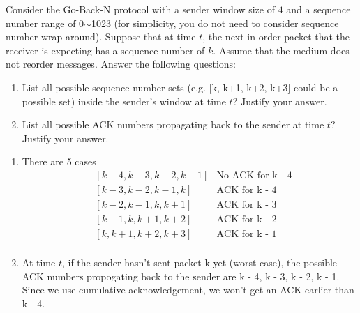 \documentclass{report}
\begin{document}
\newpage
\begin{problem}
Consider the Go-Back-N protocol with a sender window size of $4$ and a sequence number range of 0$\sim$1023 (for simplicity, you do not need to consider sequence number wrap-around). Suppose that at time $t$, the next in-order packet that the receiver is expecting has a sequence number of $k$. Assume that the medium does not reorder messages. Answer the following questions:

\begin{enumerate}
\item List all possible sequence-number-sets (e.g. [k, k+1, k+2, k+3] could be a possible set) inside the sender's window at time $t$? Justify your answer.
\item List all possible ACK numbers propagating back to the sender at time $t$? Justify your answer.
\end{enumerate}

\begin{answer}{40em}
    \begin{enumerate}
        \item There are 5 cases
            \begin{align*}
               & [k - 4, k - 3, k - 2, k - 1] & \text{No ACK for k - 4} \\
               & [k - 3, k - 2, k - 1, k] & \text{ACK for k - 4} \\
               & [k - 2, k - 1, k, k + 1] & \text{ACK for k - 3} \\
               & [k - 1, k, k + 1, k + 2] & \text{ACK for k - 2} \\
               & [k, k + 1, k + 2, k + 3] & \text{ACK for k - 1} \\
            \end{align*}
        \item At time $t$, if the sender hasn't sent packet k yet (worst case), the possible
            ACK numbers propogating back to the sender are k - 4, k - 3, k - 2, k - 1. Since we use
            cumulative acknowledgement, we won't get an ACK earlier than k - 4.
    \end{enumerate}

\end{answer}
\end{problem}
\end{document}
